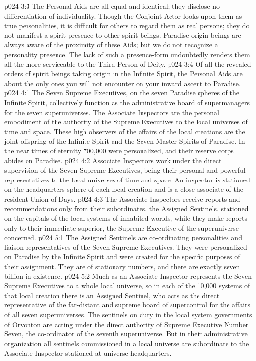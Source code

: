 \vs p024 3:3 The Personal Aids are all equal and identical; they disclose no differentiation of individuality. Though the Conjoint Actor looks upon them as true personalities, it is difficult for others to regard them as real persons; they do not manifest a spirit presence to other spirit beings. Paradise\hyp{}origin beings are always aware of the proximity of these Aids; but we do not recognize a personality presence. The lack of such a presence\hyp{}form undoubtedly renders them all the more serviceable to the Third Person of Deity.
\vs p024 3:4 Of all the revealed orders of spirit beings taking origin in the Infinite Spirit, the Personal Aids are about the only ones you will not encounter on your inward ascent to Paradise.
\vs p024 4:1 The Seven Supreme Executives, on the seven Paradise spheres of the Infinite Spirit, collectively function as the administrative board of supermanagers for the seven superuniverses. The Associate Inspectors are the personal embodiment of the authority of the Supreme Executives to the local universes of time and space. These high observers of the affairs of the local creations are the joint offspring of the Infinite Spirit and the Seven Master Spirits of Paradise. In the near times of eternity 700,000 were personalized, and their reserve corps abides on Paradise.
\vs p024 4:2 Associate Inspectors work under the direct supervision of the Seven Supreme Executives, being their personal and powerful representatives to the local universes of time and space. An inspector is stationed on the headquarters sphere of each local creation and is a close associate of the resident Union of Days.
\vs p024 4:3 The Associate Inspectors receive reports and recommendations only from their subordinates, the Assigned Sentinels, stationed on the capitals of the local systems of inhabited worlds, while they make reports only to their immediate superior, the Supreme Executive of the superuniverse concerned.
\vs p024 5:1 The Assigned Sentinels are co\hyp{}ordinating personalities and liaison representatives of the Seven Supreme Executives. They were personalized on Paradise by the Infinite Spirit and were created for the specific purposes of their assignment. They are of stationary numbers, and there are exactly seven billion in existence.
\vs p024 5:2 Much as an Associate Inspector represents the Seven Supreme Executives to a whole local universe, so in each of the 10,000 systems of that local creation there is an Assigned Sentinel, who acts as the direct representative of the far\hyp{}distant and supreme board of supercontrol for the affairs of all seven superuniverses. The sentinels on duty in the local system governments of Orvonton are acting under the direct authority of Supreme Executive Number Seven, the co\hyp{}ordinator of the seventh superuniverse. But in their administrative organization all sentinels commissioned in a local universe are subordinate to the Associate Inspector stationed at universe headquarters.
